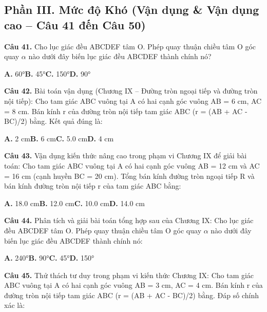 \documentclass[11pt,a4paper]{article}
\begin{document}
\subsection*{\color{accent} Phần III. Mức độ Khó (Vận dụng \& Vận dụng cao -- Câu 41 đến Câu 50)}
\textbf{\color{primary} Câu 41.} Cho lục giác đều ABCDEF tâm O. Phép quay thuận chiều tâm O góc quay $\alpha$ nào dưới đây biến lục giác đều ABCDEF thành chính nó?\par
\hspace*{1.5em}\textbf{A.} 60°\quad\quad \textbf{B.} 45°\quad\quad \textbf{C.} 150°\quad\quad \textbf{D.} 90°\par\vspace{2pt}
\textbf{\color{primary} Câu 42.} Bài toán vận dụng (Chương IX – Đường tròn ngoại tiếp và đường tròn nội tiếp): Cho tam giác ABC vuông tại A có hai cạnh góc vuông AB = 6 cm, AC = 8 cm. Bán kính r của đường tròn nội tiếp tam giác ABC (r = (AB + AC - BC)/2) bằng. Kết quả đúng là:\par
\hspace*{1.5em}\textbf{A.} 2 cm\quad\quad \textbf{B.} 6 cm\quad\quad \textbf{C.} 5.0 cm\quad\quad \textbf{D.} 4 cm\par\vspace{2pt}
\textbf{\color{primary} Câu 43.} Vận dụng kiến thức nâng cao trong phạm vi Chương IX để giải bài toán: Cho tam giác ABC vuông tại A có hai cạnh góc vuông AB = 12 cm và AC = 16 cm (cạnh huyền BC = 20 cm). Tổng bán kính đường tròn ngoại tiếp R và bán kính đường tròn nội tiếp r của tam giác ABC bằng:\par
\hspace*{1.5em}\textbf{A.} 18.0 cm\quad\quad \textbf{B.} 12.0 cm\quad\quad \textbf{C.} 10.0 cm\quad\quad \textbf{D.} 14.0 cm\par\vspace{2pt}
\textbf{\color{primary} Câu 44.} Phân tích và giải bài toán tổng hợp sau của Chương IX: Cho lục giác đều ABCDEF tâm O. Phép quay thuận chiều tâm O góc quay $\alpha$ nào dưới đây biến lục giác đều ABCDEF thành chính nó:\par
\hspace*{1.5em}\textbf{A.} 240°\quad\quad \textbf{B.} 90°\quad\quad \textbf{C.} 45°\quad\quad \textbf{D.} 150°\par\vspace{2pt}
\textbf{\color{primary} Câu 45.} Thử thách tư duy trong phạm vi kiến thức Chương IX: Cho tam giác ABC vuông tại A có hai cạnh góc vuông AB = 3 cm, AC = 4 cm. Bán kính r của đường tròn nội tiếp tam giác ABC (r = (AB + AC - BC)/2) bằng. Đáp số chính xác là:\par
\end{document}
